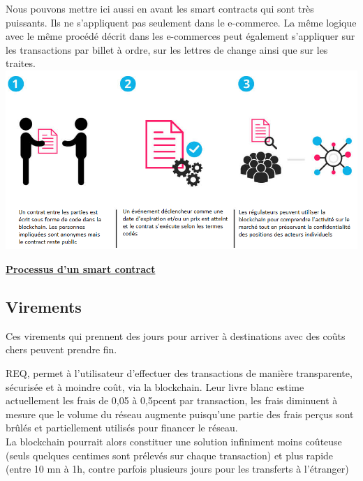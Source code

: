 \documentclass[12pt]{report}
\begin{document}
\hspace{1cm} Nous pouvons mettre ici aussi en avant les smart contracts qui sont très puissants. Ils ne s'appliquent pas seulement dans le e-commerce. La même logique avec le même procédé décrit dans les e-commerces peut également s'appliquer sur les transactions par billet à ordre, sur les lettres de change ainsi que sur les traites.\\

\includegraphics[width=1\textwidth]{contract_smart}
\begin{center}
   \textbf{\underline{Processus d'un smart contract}} \\[1cm]
\end{center}


    \subsection{Virements}
    
\hspace{1cm} Ces virements qui prennent des jours pour arriver à destinations avec des coûts chers peuvent prendre fin. 

REQ, permet à l’utilisateur d’effectuer des transactions de manière transparente, sécurisée et à moindre coût, via la blockchain. Leur livre blanc estime actuellement les frais de 0,05 à 0,5pcent par transaction, les frais diminuent à mesure que le volume du réseau augmente puisqu’une partie des frais perçus sont brûlés et partiellement utilisés pour financer le réseau.\\

La blockchain pourrait alors constituer une solution infiniment moins coûteuse (seuls quelques centimes sont prélevés sur chaque transaction) et plus rapide (entre 10 mn à 1h, contre parfois plusieurs jours pour les transferts à l’étranger)
\end{document}

